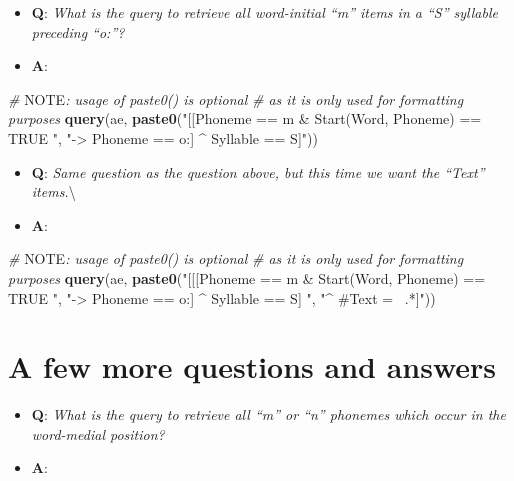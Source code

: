 \documentclass[]{book}
\newenvironment{Shaded}{\begin{snugshade}}{\end{snugshade}}
\newcommand{\AlertTok}[1]{\textcolor[rgb]{0.94,0.16,0.16}{#1}}
\newcommand{\CommentTok}[1]{\textcolor[rgb]{0.56,0.35,0.01}{\textit{#1}}}
\newcommand{\KeywordTok}[1]{\textcolor[rgb]{0.13,0.29,0.53}{\textbf{#1}}}
\newcommand{\NormalTok}[1]{#1}
\newcommand{\StringTok}[1]{\textcolor[rgb]{0.31,0.60,0.02}{#1}}
\providecommand{\tightlist}{%
  \setlength{\itemsep}{0pt}\setlength{\parskip}{0pt}}
\begin{document}
\begin{itemize}
\tightlist
\item
  \textbf{Q}: \emph{What is the query to retrieve all word-initial ``m'' items in a ``S'' syllable preceding ``o:''?}
\item
  \textbf{A}:
\end{itemize}

\begin{Shaded}
\begin{Highlighting}[]
\CommentTok{# }\AlertTok{NOTE}\CommentTok{: usage of paste0() is optional}
\CommentTok{# as it is only used for formatting purposes}
\KeywordTok{query}\NormalTok{(ae, }\KeywordTok{paste0}\NormalTok{(}\StringTok{"[[Phoneme == m & Start(Word, Phoneme) == TRUE "}\NormalTok{,}
                 \StringTok{"-> Phoneme == o:] ^ Syllable == S]"}\NormalTok{))}
\end{Highlighting}
\end{Shaded}

\begin{itemize}
\tightlist
\item
  \textbf{Q}: \emph{Same question as the question above, but this time we want the ``Text'' items.}\textbackslash{}
\item
  \textbf{A}:
\end{itemize}

\begin{Shaded}
\begin{Highlighting}[]
\CommentTok{# }\AlertTok{NOTE}\CommentTok{: usage of paste0() is optional}
\CommentTok{# as it is only used for formatting purposes}
\KeywordTok{query}\NormalTok{(ae, }\KeywordTok{paste0}\NormalTok{(}\StringTok{"[[[Phoneme == m & Start(Word, Phoneme) == TRUE "}\NormalTok{,}
                 \StringTok{"-> Phoneme == o:] ^ Syllable == S] "}\NormalTok{,}
                 \StringTok{"^ #Text =~ .*]"}\NormalTok{))}
\end{Highlighting}
\end{Shaded}

\hypertarget{a-few-more-questions-and-answers}{%
\section{A few more questions and answers}\label{a-few-more-questions-and-answers}}

\begin{itemize}
\tightlist
\item
  \textbf{Q}: \emph{What is the query to retrieve all ``m'' or ``n'' phonemes which occur in the word-medial position?}
\item
  \textbf{A}:
\end{itemize}
\end{document}
